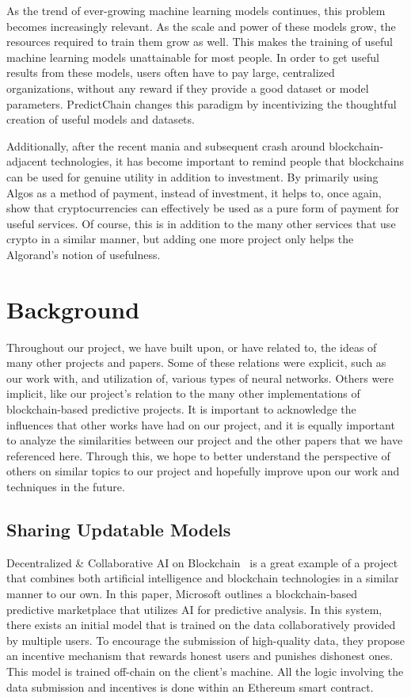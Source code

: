 \documentclass{ledger}
\begin{document}
As the trend of ever-growing machine learning models continues, this problem becomes increasingly relevant.
As the scale and power of these models grow, the resources required to train them grow as well.  This makes the training
of useful machine learning models unattainable for most people.  In order to get useful results from these models,
users often have to pay large, centralized organizations, without any reward if they provide a good dataset or model
parameters.  PredictChain changes this paradigm by incentivizing the thoughtful creation of useful models and
datasets.

Additionally, after the recent mania and subsequent crash around blockchain-adjacent technologies, it has become
important to remind people that blockchains can be used for genuine utility in addition to investment.  By primarily
using Algos as a method of payment, instead of investment, it helps to, once again, show that cryptocurrencies can
effectively be used as a pure form of payment for useful services.  Of course, this is in addition to the many other
services that use crypto in a similar manner, but adding one more project only helps the Algorand's notion of usefulness.

\section{Background}

Throughout our project, we have built upon, or have related to, the ideas of many other projects and papers.
Some of these relations were explicit, such as our work with, and utilization of, various types of neural
networks.  Others were implicit, like our project's relation to the many other implementations of
blockchain-based predictive projects.  It is important to acknowledge the influences that other works have
had on our project, and it is equally important to analyze the similarities between our project and the
other papers that we have referenced here.  Through this, we hope to better understand the perspective of
others on similar topics to our project and hopefully improve upon our work and techniques in the future.

\subsection{Sharing Updatable Models}

Decentralized \& Collaborative AI on Blockchain~\cite{sharingModels} is a great example of a project that combines
both artificial intelligence and blockchain technologies in a similar manner to our own.  In this paper, Microsoft
outlines a blockchain-based predictive marketplace that utilizes AI for predictive analysis.  In this system, there
exists an initial model that is trained on the data collaboratively provided by multiple users.  To encourage
the submission of high-quality data, they propose an incentive mechanism that rewards honest users and punishes
dishonest ones.  This model is trained off-chain on the client's machine.  All the logic involving the
data submission and incentives is done within an Ethereum smart contract.
\end{document}
